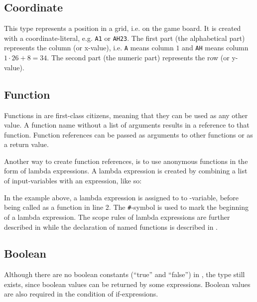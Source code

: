 
\subsection{Coordinate}
\label{sec:coordinatetype}

This type represents a position in a grid, i.e. on the game board. It is created with
a coordinate-literal, e.g. \texttt{A1} or \texttt{AH23}. The first part (the alphabetical part)
represents the column (or x-value), i.e. \texttt{A} means column $1$ and \texttt{AH} means
column $1 \cdot 26 + 8 = 34$. The second part (the numeric part) represents the row (or y-value).


\subsection{Function}
\label{sec:functiontype}
Functions in \productname{} are first-class citizens, meaning that they can be used as any
other value. A function name without a list of arguments results in a reference to that
function. Function references can be passed as arguments to other functions or as a return
value.


Another way to create function references, is to use anonymous functions in the form
of lambda expressions. A lambda expression is created by combining a list of input-variables
with an expression, like so:


In the example above, a lambda expression is assigned to to -variable, before
being called as a function in line 2. The \texttt{\#}-symbol is used to mark the beginning
of a lambda expression. The scope rules of lambda expressions are further described in 
while the declaration of named functions is described in .

\subsection{Boolean}
Although there are no boolean constants (``true'' and ``false'') in \productname, the type still exists, since
boolean values can be returned by some expressions. Boolean values are also required in the condition of
if-expressions.

